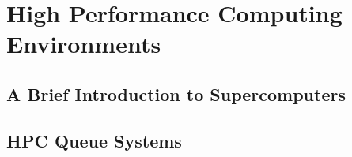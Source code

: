 \section{High Performance Computing Environments}
\label{sec:hpcenv}

\subsection{A Brief Introduction to Supercomputers}

\subsection{HPC Queue Systems}
